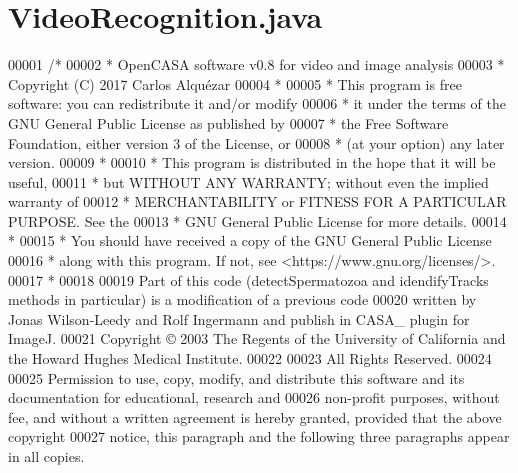 \hypertarget{_video_recognition_8java_source}{}\section{Video\+Recognition.\+java}
\label{_video_recognition_8java_source}

\begin{DoxyCode}
00001 \textcolor{comment}{/*}
00002 \textcolor{comment}{ *   OpenCASA software v0.8 for video and image analysis}
00003 \textcolor{comment}{ *   Copyright (C) 2017  Carlos Alquézar}
00004 \textcolor{comment}{ *}
00005 \textcolor{comment}{ *   This program is free software: you can redistribute it and/or modify}
00006 \textcolor{comment}{ *   it under the terms of the GNU General Public License as published by}
00007 \textcolor{comment}{ *   the Free Software Foundation, either version 3 of the License, or}
00008 \textcolor{comment}{ *   (at your option) any later version.}
00009 \textcolor{comment}{ *}
00010 \textcolor{comment}{ *   This program is distributed in the hope that it will be useful,}
00011 \textcolor{comment}{ *   but WITHOUT ANY WARRANTY; without even the implied warranty of}
00012 \textcolor{comment}{ *   MERCHANTABILITY or FITNESS FOR A PARTICULAR PURPOSE.  See the}
00013 \textcolor{comment}{ *   GNU General Public License for more details.}
00014 \textcolor{comment}{ *}
00015 \textcolor{comment}{ *   You should have received a copy of the GNU General Public License}
00016 \textcolor{comment}{ *   along with this program.  If not, see <https://www.gnu.org/licenses/>.}
00017 \textcolor{comment}{ *   }
00018 \textcolor{comment}{}
00019 \textcolor{comment}{Part of this code (detectSpermatozoa and idendifyTracks methods in particular) is a modification of a
       previous code }
00020 \textcolor{comment}{written by Jonas Wilson-Leedy and Rolf Ingermann and publish in CASA\_ plugin for ImageJ.}
00021 \textcolor{comment}{Copyright © 2003 The Regents of the University of California and the Howard Hughes Medical Institute.}
00022 \textcolor{comment}{}
00023 \textcolor{comment}{All Rights Reserved.}
00024 \textcolor{comment}{}
00025 \textcolor{comment}{Permission to use, copy, modify, and distribute this software and its documentation for educational,
       research and }
00026 \textcolor{comment}{non-profit purposes, without fee, and without a written agreement is hereby granted, provided that the
       above copyright }
00027 \textcolor{comment}{notice, this paragraph and the following three paragraphs appear in all copies.}

\end{DoxyCode}
